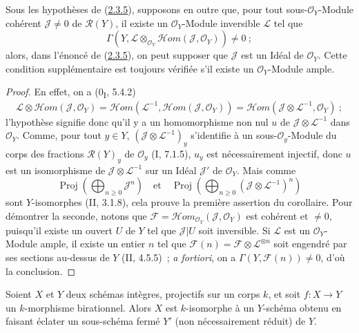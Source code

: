 \begin{corollary}[2.3.6]
\label{III.2.3.6-fr}
Sous les hypothèses de (\hyperref[III.2.3.5-fr]{2.3.5}), supposons en
outre que, pour tout sous-$\mathcal O_Y$-Module cohérent
$\mathcal J\neq0$ de $\mathcal R(Y)$, il existe un
$\mathcal O_Y$-Module inversible $\mathcal L$ tel que
\[
\Gamma(Y,\mathcal L\otimes_{\mathcal O_Y}
\mathcal{H}om(\mathcal J,\mathcal O_Y))\neq0~;
\]
alors, dans l'énoncé de (\hyperref[III.2.3.5-fr]{2.3.5}), on peut supposer
que $\mathcal J$ est un Idéal de $\mathcal O_Y$. Cette condition
supplémentaire est toujours vérifiée s'il existe un
$\mathcal O_Y$-Module ample.
\end{corollary}

\begin{proof}
En effet, on a (0\textsubscript{I}, 5.4.2)
\[
\mathcal L\otimes\mathcal{H}om(\mathcal J,\mathcal O_Y)
=\mathcal{H}om(\mathcal L^{-1},\mathcal{H}om(\mathcal J,\mathcal O_Y))
=\mathcal{H}om(\mathcal J\otimes\mathcal L^{-1},\mathcal O_Y)~;
\]
l'hypothèse signifie donc qu'il y a un homomorphisme non nul $u$ de
$\mathcal J\otimes\mathcal L^{-1}$ dans $\mathcal O_Y$. Comme, pour tout
$y\in Y$, $(\mathcal J\otimes\mathcal L^{-1})_y$ s'identifie à un
sous-$\mathcal O_y$-Module du corps des fractions $\mathcal R(Y)_y$ de
$\mathcal O_y$ (I, 7.1.5), $u_y$ est nécessairement injectif, donc $u$
est un isomorphisme de $\mathcal J\otimes\mathcal L^{-1}$ sur un Idéal
$\mathcal J'$ de $\mathcal O_Y$. Mais comme
\[
\operatorname{Proj}\left(\bigoplus_{n\geq0}\mathcal J^n\right)
\quad\text{et}\quad
\operatorname{Proj}\left(
\bigoplus_{n\geq0}(\mathcal J\otimes\mathcal L^{-1})^n\right)
\]
sont $Y$-isomorphes (II, 3.1.8), cela prouve la première assertion du
corollaire. Pour démontrer la seconde, notons que
$\mathcal F=\mathcal{H}om_{\mathcal O_Y}(\mathcal J,\mathcal O_Y)$ est
cohérent et $\neq0$, puisqu'il existe un ouvert $U$ de $Y$ tel que
$\mathcal J|U$ soit inversible. Si $\mathcal L$ est un
$\mathcal O_Y$-Module ample, il existe un entier $n$ tel que
$\mathcal F(n)=\mathcal F\otimes\mathcal L^{\otimes n}$ soit engendré par
ses sections au-dessus de $Y$ (II, 4.5.5)~; \emph{a fortiori}, on a
$\Gamma(Y,\mathcal F(n))\neq0$, d'où la conclusion.
\end{proof}

\begin{corollary}[2.3.7]
\label{III.2.3.7-fr}
Soient $X$ et $Y$ deux schémas intègres, projectifs sur un corps $k$, et
soit $f:X\to Y$ un $k$-morphisme birationnel. Alors $X$ est $k$-isomorphe
à un $Y$-schéma obtenu en faisant éclater un sous-schéma fermé $Y'$
(non nécessairement réduit) de $Y$.
\end{corollary}

